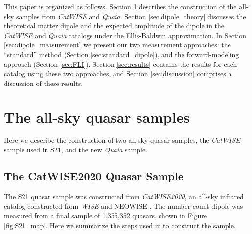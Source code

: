 \documentclass[modern]{aastex631}
\newcommand{\catwise}{\textsl{CatWISE}\xspace}
\newcommand{\catwisetwentytwenty}{\textsl{CatWISE2020}\xspace}
\newcommand{\quaia}{\textsl{Quaia}\xspace}
\newcommand{\wise}{\textsl{WISE}\xspace}
\begin{document}
This paper is organized as follows.
Section \ref{sec:data} describes the construction of the all-sky samples from \catwise and \quaia.
Section \ref{sec:dipole_theory} discusses the theoretical matter dipole and the expected amplitude of the dipole in the \catwise and \quaia catalogs under the Ellis-Baldwin approximation.
In Section \ref{sec:dipole_measurement} we present our two measurement approaches: the ``standard'' method (Section \ref{sec:standard_dipole}), and the forward-modeling approach (Section \ref{sec:FLI}).
Section \ref{sec:results} contains the results for each catalog using these two approaches, and Section \ref{sec:discussion} comprises a discussion of these results.


\section{The all-sky quasar samples}
\label{sec:data}

Here we describe the construction of two all-sky quasar samples, the \catwise sample used in S21, and the new \quaia sample.

\subsection{The CatWISE2020 Quasar Sample}
\label{sec:catwise}
The S21 quasar sample was constructed from \catwisetwentytwenty, an all-sky infrared catalog constructed from \wise and NEOWISE \citep{marocco_catwise2020_2021}.
The number-count dipole was measured from a final sample of 1,355,352 quasars, shown in Figure \ref{fig:S21_map}.
Here we summarize the steps used in \citet{secrest_test_2021} to construct the sample.
\end{document}
